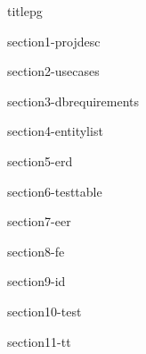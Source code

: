 \documentclass{article}
\begin{document}
{titlepg}

\tableofcontents
\pagebreak

{section1-projdesc}

{section2-usecases}

{section3-dbrequirements}

{section4-entitylist}

{section5-erd}

{section6-testtable}

{section7-eer}

{section8-fe}

{section9-id}

{section10-test}

{section11-tt}
\end{document}
